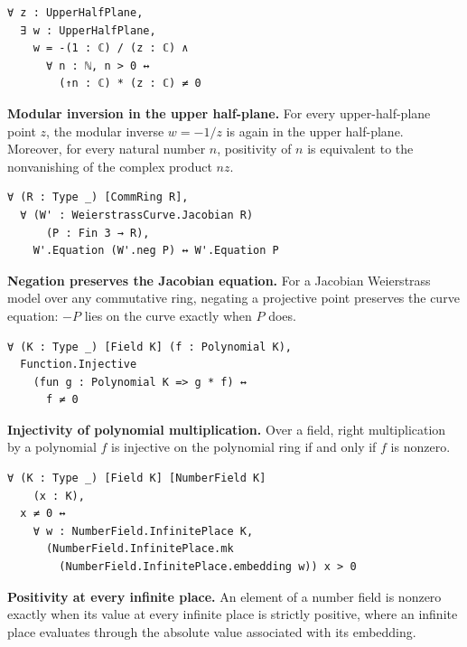 \begin{list}{}
\item
\begin{samepage}
\begin{lstlisting}[basicstyle=\ttfamily\footnotesize,frame=single,breaklines=true]
∀ z : UpperHalfPlane,
  ∃ w : UpperHalfPlane,
    w = -(1 : ℂ) / (z : ℂ) ∧
      ∀ n : ℕ, n > 0 ↔
        (↑n : ℂ) * (z : ℂ) ≠ 0
\end{lstlisting}
\noindent\textbf{Modular inversion in the upper half-plane.}
For every upper-half-plane point $z$, the modular inverse $w=-1/z$ is again in
the upper half-plane. Moreover, for every natural number $n$, positivity of
$n$ is equivalent to the nonvanishing of the complex product $nz$.
\end{samepage}

\item
\begin{samepage}
\begin{lstlisting}[basicstyle=\ttfamily\footnotesize,frame=single,breaklines=true]
∀ (R : Type _) [CommRing R],
  ∀ (W' : WeierstrassCurve.Jacobian R)
      (P : Fin 3 → R),
    W'.Equation (W'.neg P) ↔ W'.Equation P
\end{lstlisting}
\noindent\textbf{Negation preserves the Jacobian equation.}
For a Jacobian Weierstrass model over any commutative ring, negating a
projective point preserves the curve equation: $-P$ lies on the curve exactly
when $P$ does.
\end{samepage}

\item
\begin{samepage}
\begin{lstlisting}[basicstyle=\ttfamily\footnotesize,frame=single,breaklines=true]
∀ (K : Type _) [Field K] (f : Polynomial K),
  Function.Injective
    (fun g : Polynomial K => g * f) ↔
      f ≠ 0
\end{lstlisting}
\noindent\textbf{Injectivity of polynomial multiplication.}
Over a field, right multiplication by a polynomial $f$ is injective on the
polynomial ring if and only if $f$ is nonzero.
\end{samepage}

\item
\begin{samepage}
\begin{lstlisting}[basicstyle=\ttfamily\footnotesize,frame=single,breaklines=true]
∀ (K : Type _) [Field K] [NumberField K]
    (x : K),
  x ≠ 0 ↔
    ∀ w : NumberField.InfinitePlace K,
      (NumberField.InfinitePlace.mk
        (NumberField.InfinitePlace.embedding w)) x > 0
\end{lstlisting}
\noindent\textbf{Positivity at every infinite place.}
An element of a number field is nonzero exactly when its value at every
infinite place is strictly positive, where an infinite place evaluates through
the absolute value associated with its embedding.
\end{samepage}


\end{list}
